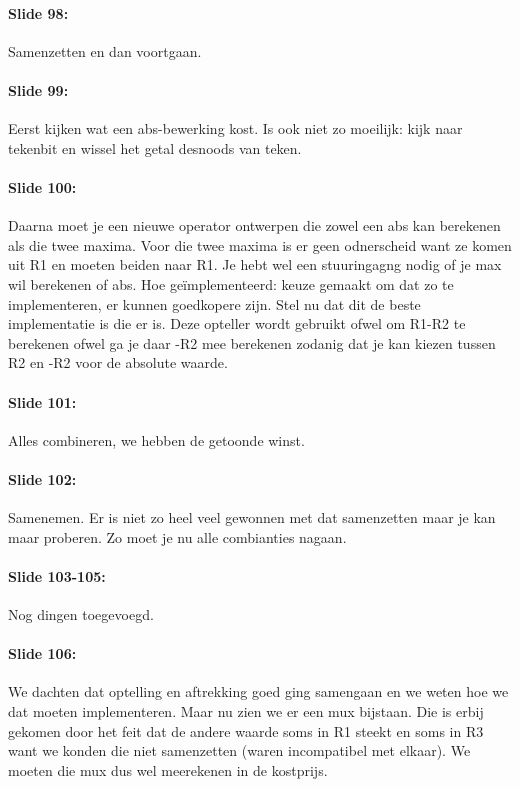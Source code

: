 \documentclass[10pt,a4paper]{book}
\begin{document}
\paragraph{Slide 98:} Samenzetten en dan voortgaan.

\paragraph{Slide 99:} Eerst kijken wat een abs-bewerking kost. Is ook niet zo moeilijk: kijk naar tekenbit en wissel het getal desnoods van teken. 

\paragraph{Slide 100:} Daarna moet je een nieuwe operator ontwerpen die zowel een abs kan berekenen als die twee maxima. Voor die twee maxima is er geen odnerscheid want ze komen uit R1 en moeten beiden naar R1. Je hebt wel een stuuringagng nodig of je max wil berekenen of abs. Hoe ge\"implementeerd: keuze gemaakt om dat zo te implementeren, er kunnen goedkopere zijn. Stel nu dat dit de beste implementatie is die er is. Deze opteller wordt gebruikt ofwel om R1-R2 te berekenen ofwel ga je daar -R2 mee berekenen zodanig dat je kan kiezen tussen R2 en -R2 voor de absolute waarde.

\paragraph{Slide 101:} Alles combineren, we hebben de getoonde winst.

\paragraph{Slide 102:} Samenemen. Er is niet zo heel veel gewonnen met dat samenzetten maar je kan maar proberen. Zo moet je nu alle combianties nagaan.

\paragraph{Slide 103-105:} Nog dingen toegevoegd.

\paragraph{Slide 106:} We dachten dat optelling en aftrekking goed ging samengaan en we weten hoe we dat moeten implementeren. Maar nu zien we er een mux bijstaan. Die is erbij gekomen door het feit dat de andere waarde soms in R1 steekt en soms in R3 want we konden die niet samenzetten (waren incompatibel met elkaar). We moeten die mux dus wel meerekenen in de kostprijs.
\end{document}
